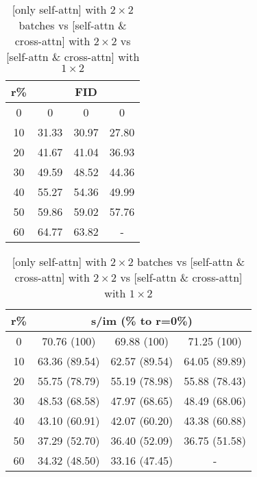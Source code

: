 \begin{table}[htp]
\caption{[only self-attn] with $2 \times 2$ batches vs [self-attn \& cross-attn] with $2 \times 2$ vs [self-attn \& cross-attn] with $1 \times 2$}
\label{table:exp_4}
    \begin{minipage}{0.4\textwidth}
        \begin{tabular}{|c||c|c|c|}
            \hline
            \multicolumn{1}{|c||}{r\%} & \multicolumn{3}{c|}{FID}\\
            \hline
            0 & 0 & 0 & 0 \\
            10 & 31.33 & 30.97 & 27.80 \\
            20 & 41.67 & 41.04 & 36.93 \\
            30 & 49.59 & 48.52 & 44.36 \\
            40 & 55.27 & 54.36 & 49.99 \\
            50 & 59.86 & 59.02 & 57.76 \\
            60 & 64.77 & 63.82 & - \\
            \hline
        \end{tabular}
    \end{minipage}
    \begin{minipage}{0.4\textwidth}
        \begin{tabular}{|c||c|c|c|}
            \hline
            \multicolumn{1}{|c||}{r\%} & \multicolumn{3}{c|}{s/im (\% to r=0\%)}\\
            \hline
            0 & 70.76 (100) & 69.88 (100) & 71.25 (100) \\
            10 & 63.36 (89.54) & 62.57 (89.54) & 64.05 (89.89) \\
            20 & 55.75 (78.79) & 55.19 (78.98) & 55.88 (78.43) \\
            30 & 48.53 (68.58) & 47.97 (68.65) & 48.49 (68.06) \\
            40 & 43.10 (60.91) & 42.07 (60.20) & 43.38 (60.88) \\
            50 & 37.29 (52.70) & 36.40 (52.09) & 36.75 (51.58) \\
            60 & 34.32 (48.50) & 33.16 (47.45) & - \\
            \hline
        \end{tabular}
    \end{minipage}
\end{table}